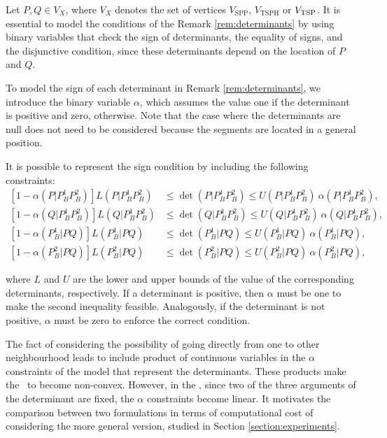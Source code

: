 \documentclass[a4paper,  review, authoryear, 1p.]{elsarticle}
\newcommand{\TSPHN}{{\sf{H-TSPHN}\xspace }}
\newcommand{\TSPN}{{\sf{H-TSPN}\xspace }}
\newcommand{\VSPP}{{V_{\text{SPP}}}}
\newcommand{\VTSPH}{{V_{\text{TSPH}}}}
\newcommand{\CV}[1]{{\color{red}#1}}
\newcommand{\determinant}[3]{\det({#1|#2#3})}
\begin{document}
	
	
	
	Let $P,Q\in V_X$, where $V_X$ denotes the set of vertices $\VSPP$, $\VTSPH$ or $V_{\rm{TSP}}$. It is essential to model the conditions of the Remark \ref{rem:determinants} by using binary variables that check the sign of determinants, the equality of signs, and the disjunctive condition, since these determinants depend on the location of $P$ and $Q$.
	
	\newcommand{\LS}[3]{L(#1|#2#3)}
	\newcommand{\US}[3]{U(#1|#2#3)}
	\newcommand{\alphamas}[3]{\alpha(#1|#2#3)}
	\newcommand{\alphamenos}[3]{\alpha^{-}(#1|#2#3)}
	\newcommand{\alphapunto}[3]{\alpha^{\cdotp}(#1|#2#3)}
	
	To model the sign of each determinant in Remark \ref{rem:determinants}, we introduce the binary variable $\alpha$, which assumes the value one if the determinant is positive and zero, otherwise. Note that the case where the determinants are null does not need to be considered because the segments are located in a general position.
	
	It is possible to represent the sign condition by including the following constraints:
	\begin{align*}\tag{$\alpha$-C}\label{eq:alphaC}
		\left[1-\alphamas{P}{P_B^1}{P_B^2}\right]\LS{P}{P_B^1}{P_B^2}&\leq\determinant{P}{P_B^1}{P_B^2}\leq \US{P}{P_B^1}{P_B^2}\:\alphamas{P}{P_B^1}{P_B^2},\\
		\left[1-\alphamas{Q}{P_B^1}{P_B^2}\right]\LS{Q}{P_B^1}{P_B^2}&\leq\determinant{Q}{P_B^1}{P_B^2}\leq \US{Q}{P_B^1}{P_B^2}\:\alphamas{Q}{P_B^1}{P_B^2},\\
		\left[1-\alphamas{P_B^1}{P}{Q}\right]\LS{P_B^1}{P}{Q}&\leq\determinant{P_B^1}{P}{Q}\leq \US{P_B^1}{P}{Q}\:\alphamas{P_B^1}{P}{Q},\\		\left[1-\alphamas{P_B^2}{P}{Q}\right]\LS{P_B^2}{P}{Q}&\leq\determinant{P_B^2}{P}{Q}\leq \US{P_B^2}{P}{Q}\:\alphamas{P_B^2}{P}{Q},
	\end{align*}
	
	\noindent where $L$ and $U$ are the lower and upper bounds of the value of the corresponding determinants, respectively. If a determinant is positive, then $\alpha$ must be one to make the second inequality feasible. Analogously, if the determinant is not positive, $\alpha$ must be zero to enforce the correct condition.
	
	\CV{The fact of considering the possibility of going directly from one to other neighbourhood leads to include product of continuous variables in the $\alpha$ constraints of the model that represent the determinants. These products make the \TSPN \ to become non-convex. However, in the \TSPHN, since two of the three arguments of the determinant are fixed, the $\alpha$ constraints become linear. It motivates the comparison between two formulations in terms of computational cost of considering the more general version, studied in Section \ref{section:experiments}.}
		
\end{document}

